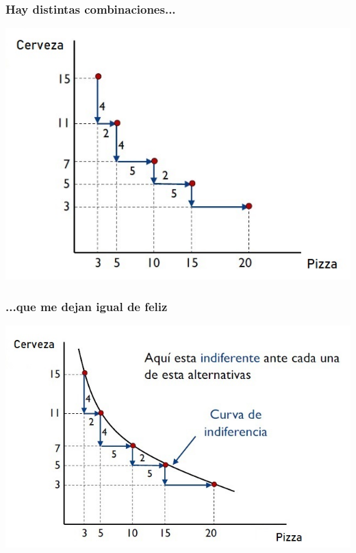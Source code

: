 \documentclass{beamer}
\begin{document}
\begin{frame}
\frametitle{Hay distintas combinaciones...}
\centering
\includegraphics[scale=0.6]{Slides Principios de Economia/Figures/Tema_02.12_rp10.jpg}
\end{frame}

\begin{frame}
\frametitle{...que me dejan igual de feliz}
\centering
\includegraphics[scale=0.6]{Slides Principios de Economia/Figures/Tema_02.13_rp11.jpg}
\end{frame}
\end{document}
